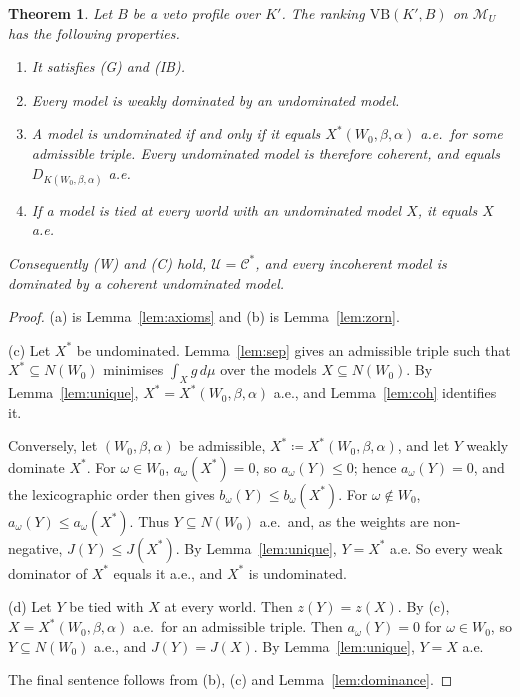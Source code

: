 \documentclass[11pt]{article}
\newcommand{\M}{\mathcal{M}}
\newcommand{\VB}{\mathrm{VB}}
\theoremstyle{plain}
\newtheorem{theorem}{Theorem}[section]
\theoremstyle{definition}
\theoremstyle{remark}
\begin{document}
\begin{theorem}\label{thm:family}
Let $B$ be a veto profile over $K'$. The ranking $\VB(K',B)$ on $\M_U$ has the following
properties.
\begin{enumerate}[label=(\alph*)]
  \item It satisfies (G) and (IB).
  \item Every model is weakly dominated by an undominated model.
  \item A model is undominated if and only if it equals $X^\ast(W_0,\beta,\alpha)$ a.e.\
  for some admissible triple. Every undominated model is therefore coherent, and equals
  $D_{K(W_0,\beta,\alpha)}$ a.e.
  \item If a model is tied at every world with an undominated model $X$, it equals $X$
  a.e.
\end{enumerate}
Consequently (W) and (C) hold, $\mathcal U=\mathcal C^\ast$, and every incoherent model is
dominated by a coherent undominated model.
\end{theorem}

\begin{proof}
(a) is Lemma~\ref{lem:axioms} and (b) is Lemma~\ref{lem:zorn}.

(c) Let $X^\ast$ be undominated. Lemma~\ref{lem:sep} gives an admissible triple such that
$X^\ast\subseteq N(W_0)$ minimises $\int_Xg\,d\mu$ over the models $X\subseteq N(W_0)$. By
Lemma~\ref{lem:unique}, $X^\ast=X^\ast(W_0,\beta,\alpha)$ a.e., and
Lemma~\ref{lem:coh} identifies it.

Conversely, let $(W_0,\beta,\alpha)$ be admissible, $X^\ast\coloneqq X^\ast(W_0,\beta,
\alpha)$, and let $Y$ weakly dominate $X^\ast$. For $\omega\in W_0$, $a_\omega(X^\ast)=0$,
so $a_\omega(Y)\le0$; hence $a_\omega(Y)=0$, and the lexicographic order then gives
$b_\omega(Y)\le b_\omega(X^\ast)$. For $\omega\notin W_0$, $a_\omega(Y)\le
a_\omega(X^\ast)$. Thus $Y\subseteq N(W_0)$ a.e.\ and, as the weights are non-negative,
$J(Y)\le J(X^\ast)$. By Lemma~\ref{lem:unique}, $Y=X^\ast$ a.e. So every weak dominator of
$X^\ast$ equals it a.e., and $X^\ast$ is undominated.

(d) Let $Y$ be tied with $X$ at every world. Then $z(Y)=z(X)$. By (c),
$X=X^\ast(W_0,\beta,\alpha)$ a.e.\ for an admissible triple. Then $a_\omega(Y)=0$ for
$\omega\in W_0$, so $Y\subseteq N(W_0)$ a.e., and $J(Y)=J(X)$. By
Lemma~\ref{lem:unique}, $Y=X$ a.e.

The final sentence follows from (b), (c) and Lemma~\ref{lem:dominance}.
\end{proof}
\end{document}
